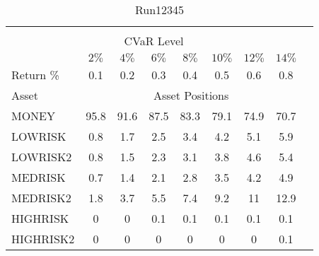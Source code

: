 \begin{table}[h!t]
\caption{Run12345}
\centering
\begin{tabular}[t]{ l c c c c c c c c }
\hline\hline \\
\multicolumn{8}{c}{CVaR Level} \\
 & $2\%$ & $4\%$ & $6\%$ & $8\%$ & $10\%$ & $12\%$ & $14\%$ \\[0.5ex]
Return \% &0.1 &0.2 &0.3 &0.4 &0.5 &0.6 &0.8\\[0.5ex]
Asset & \multicolumn{7}{c}{Asset Positions} \\[1ex]
MONEY & 95.8 & 91.6 & 87.5 & 83.3 & 79.1 & 74.9 & 70.7\\
LOWRISK & 0.8 & 1.7 & 2.5 & 3.4 & 4.2 & 5.1 & 5.9\\
LOWRISK2 & 0.8 & 1.5 & 2.3 & 3.1 & 3.8 & 4.6 & 5.4\\
MEDRISK & 0.7 & 1.4 & 2.1 & 2.8 & 3.5 & 4.2 & 4.9\\
MEDRISK2 & 1.8 & 3.7 & 5.5 & 7.4 & 9.2 & 11 & 12.9\\
HIGHRISK & 0 & 0 & 0.1 & 0.1 & 0.1 & 0.1 & 0.1\\
HIGHRISK2 & 0 & 0 & 0 & 0 & 0 & 0 & 0.1\\
[1ex] \hline
\end{tabular}
\end{table} 